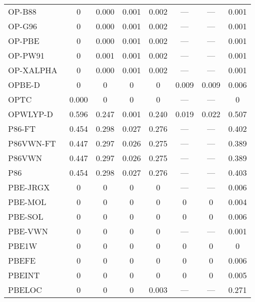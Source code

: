 \begin{table}
\begin{tabular}{|l|c|c|c|c|c|c|c|}
OP-B88~\cite{Tsuneda1999_10664} & 0 & 0.000 & 0.001 & 0.002 & --- & --- & 0.001 \\
OP-G96~\cite{Tsuneda1999_10664,Tsuneda1999_5656} & 0 & 0.000 & 0.001 & 0.002 & --- & --- & 0.001 \\
OP-PBE~\cite{Tsuneda1999_10664,Tsuneda1999_5656} & 0 & 0.000 & 0.001 & 0.002 & --- & --- & 0.001 \\
OP-PW91~\cite{Tsuneda1999_10664,Tsuneda1999_5656} & 0 & 0.001 & 0.001 & 0.002 & --- & --- & 0.001 \\
OP-XALPHA~\cite{Tsuneda1999_10664,Tsuneda1999_5656} & 0 & 0.000 & 0.001 & 0.002 & --- & --- & 0.001 \\
OPBE-D~\cite{Goerigk2010_107} & 0 & 0 & 0 & 0 & 0.009 & 0.009 & 0.006 \\
OPTC~\cite{Cohen2001_607} & 0.000 & 0 & 0 & 0 & --- & --- & 0 \\
OPWLYP-D~\cite{Goerigk2010_107} & 0.596 & 0.247 & 0.001 & 0.240 & 0.019 & 0.022 & 0.507 \\
P86-FT~\cite{Perdew1986_8822} & 0.454 & 0.298 & 0.027 & 0.276 & --- & --- & 0.402 \\
P86VWN-FT~\cite{Perdew1986_8822} & 0.447 & 0.297 & 0.026 & 0.275 & --- & --- & 0.389 \\
P86VWN~\cite{Perdew1986_8822} & 0.447 & 0.297 & 0.026 & 0.275 & --- & --- & 0.389 \\
P86~\cite{Perdew1986_8822} & 0.454 & 0.298 & 0.027 & 0.276 & --- & --- & 0.403 \\
PBE-JRGX~\cite{Pedroza2009_201106} & 0 & 0 & 0 & 0 & --- & --- & 0.006 \\
PBE-MOL~\cite{delCampo2012_104108} & 0 & 0 & 0 & 0 & 0 & 0 & 0.004 \\
PBE-SOL~\cite{Perdew2008_136406} & 0 & 0 & 0 & 0 & 0 & 0 & 0.006 \\
PBE-VWN~\cite{Kraisler2010_042516,Perdew1996_3865,Perdew1996_3865_err} & 0 & 0 & 0 & 0 & --- & --- & 0.001 \\
PBE1W~\cite{Dahlke2005_15677} & 0 & 0 & 0 & 0 & 0 & 0 & 0 \\
PBEFE~\cite{Perez2015_3844} & 0 & 0 & 0 & 0 & 0 & 0 & 0.006 \\
PBEINT~\cite{Fabiano2010_113104} & 0 & 0 & 0 & 0 & 0 & 0 & 0.005 \\
PBELOC~\cite{Constantin2012_035130} & 0 & 0 & 0 & 0.003 & --- & --- & 0.271 \\
\bottomrule
\end{tabular}
\end{table}
